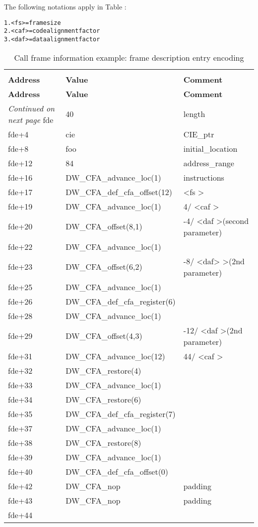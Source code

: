 The following notations apply in 
Table :

\begin{alltt}
1. <fs> = frame size
2. <caf> = code alignment factor
3. <daf> = data alignment factor
\end{alltt}


\begin{centering}
\setlength{\extrarowheight}{0.1cm}
\begin{longtable}{lll}
  \caption{Call frame information example: frame description entry encoding} \label{tab:callframeinformationexampleframedescriptionentryencoding} \\
  \hline \\ \bfseries Address &\bfseries Value &\bfseries Comment \\ \hline
\endfirsthead
  \bfseries Address &\bfseries Value &\bfseries Comment \\ \hline
\endhead
  \hline \emph{Continued on next page}
\endfoot
  \hline
\endlastfoot
fde&40&length \\
fde+4&cie&CIE\_ptr \\
fde+8&foo&initial\_location \\
fde+12&84&address\_range \\
fde+16&DW\_CFA\_advance\_loc(1)&instructions \\
fde+17&DW\_CFA\_def\_cfa\_offset(12)& \textless fs \textgreater \\
fde+19&DW\_CFA\_advance\_loc(1)&4/ \textless caf \textgreater \\
fde+20&DW\_CFA\_offset(8,1)&-4/ \textless daf \textgreater (second parameter) \\
fde+22&DW\_CFA\_advance\_loc(1)& \\
fde+23&DW\_CFA\_offset(6,2)&-8/ \textless daf> \textgreater (2nd parameter)  \\
fde+25&DW\_CFA\_advance\_loc(1) & \\
fde+26&DW\_CFA\_def\_cfa\_register(6) & \\
fde+28&DW\_CFA\_advance\_loc(1) & \\
fde+29&DW\_CFA\_offset(4,3)&-12/ \textless daf \textgreater (2nd parameter) \\
fde+31&DW\_CFA\_advance\_loc(12)&44/ \textless caf \textgreater \\
fde+32&DW\_CFA\_restore(4)& \\
fde+33&DW\_CFA\_advance\_loc(1) & \\
fde+34&DW\_CFA\_restore(6) & \\
fde+35&DW\_CFA\_def\_cfa\_register(7)  & \\
fde+37&DW\_CFA\_advance\_loc(1) & \\
fde+38&DW\_CFA\_restore(8) &\\
fde+39&DW\_CFA\_advance\_loc(1) &\\
fde+40&DW\_CFA\_def\_cfa\_offset(0)  &\\
fde+42&DW\_CFA\_nop&padding \\
fde+43&DW\_CFA\_nop&padding \\
fde+44 && \\
\end{longtable}
\end{centering}

